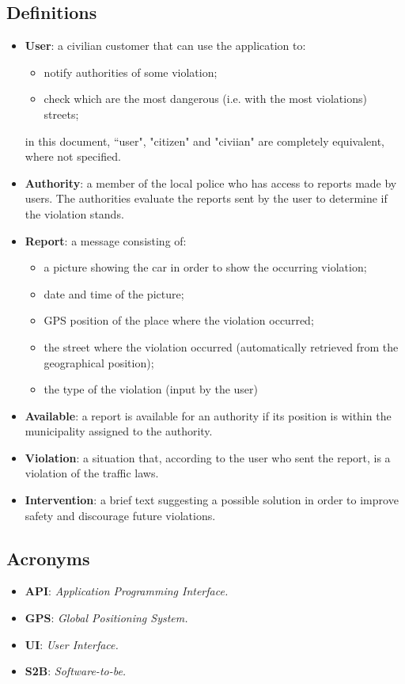 \documentclass[12pt,a4paper]{report}
\begin{document}
		\subsection{Definitions}
		\begin{itemize}
		\item \textbf{User}: a civilian customer that can use the application to:
			\begin{itemize}
			\item notify authorities of some violation;
			\item check which are the most dangerous (i.e. with the most violations) streets;
			\end{itemize}
		in this document, ``user", "citizen" and "civiian" are completely equivalent, where not specified.
		\item \textbf{Authority}: a member of the local police who has access to reports made by users. The 					authorities evaluate the reports sent by the user to determine if the violation stands.
		\item \textbf{Report}: a message consisting of:
			\begin{itemize}
			\item a picture showing the car in order to show the occurring violation;
			\item date and time of the picture;
			\item GPS position of the place where the violation occurred;
			\item the street where the violation occurred (automatically retrieved from the geographical position);
			\item the type of the violation (input by the user)
			\end{itemize}
		\item \textbf{Available}: a report is available for an authority if its position is within the municipality assigned to the authority.
		\item \textbf{Violation}: a situation that, according to the user who sent the report, is a violation of the traffic laws.
		\item \textbf{Intervention}: a brief text suggesting a possible solution in order to improve safety and discourage future violations.
		\end{itemize}
		\subsection{Acronyms}
			\begin{itemize}
			\item \textbf{API}: \emph{Application Programming Interface.}
			\item \textbf{GPS}: \emph{Global Positioning System.}
			\item \textbf{UI}: \emph{User Interface.}		
			\item \textbf{S2B}: \emph{Software-to-be.}	
			\end{itemize}
\end{document}
